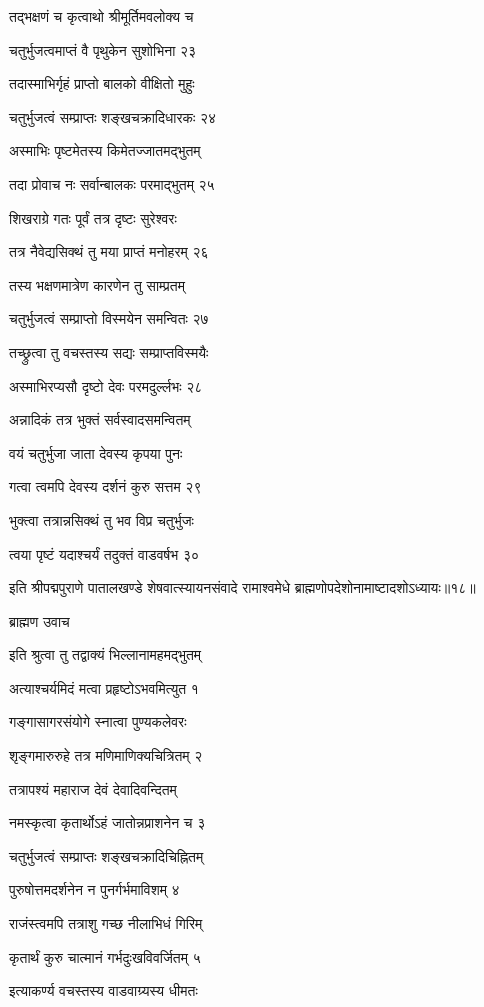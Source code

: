 तद्भक्षणं च कृत्वाथो श्रीमूर्तिमवलोक्य च

चतुर्भुजत्वमाप्तं वै पृथुकेन सुशोभिना २३

तदास्माभिर्गृहं प्राप्तो बालको वीक्षितो मुहुः

चतुर्भुजत्वं सम्प्राप्तः शङ्खचक्रादिधारकः २४

अस्माभिः पृष्टमेतस्य किमेतज्जातमद्भुतम्

तदा प्रोवाच नः सर्वान्बालकः परमाद्भुतम् २५

शिखराग्रे गतः पूर्वं तत्र दृष्टः सुरेश्वरः

तत्र नैवेद्यसिक्थं तु मया प्राप्तं मनोहरम् २६

तस्य भक्षणमात्रेण कारणेन तु साम्प्रतम्

चतुर्भुजत्वं सम्प्राप्तो विस्मयेन समन्वितः २७

तच्छ्रुत्वा तु वचस्तस्य सद्यः सम्प्राप्तविस्मयैः

अस्माभिरप्यसौ दृष्टो देवः परमदुर्ल्लभः २८

अन्नादिकं तत्र भुक्तं सर्वस्वादसमन्वितम्

वयं चतुर्भुजा जाता देवस्य कृपया पुनः

गत्वा त्वमपि देवस्य दर्शनं कुरु सत्तम २९

भुक्त्वा तत्रान्नसिक्थं तु भव विप्र चतुर्भुजः

त्वया पृष्टं यदाश्चर्यं तदुक्तं वाडवर्षभ ३०

इति श्रीपद्मपुराणे पातालखण्डे शेषवात्स्यायनसंवादे रामाश्वमेधे ब्राह्मणोपदेशोनामाष्टादशोऽध्यायः॥१८॥


ब्राह्मण उवाच

इति श्रुत्वा तु तद्वाक्यं भिल्लानामहमद्भुतम्

अत्याश्चर्यमिदं मत्वा प्रहृष्टोऽभवमित्युत १

गङ्गासागरसंयोगे स्नात्वा पुण्यकलेवरः

शृङ्गमारुरुहे तत्र मणिमाणिक्यचित्रितम् २

तत्रापश्यं महाराज देवं देवादिवन्दितम्

नमस्कृत्वा कृतार्थोऽहं जातोन्नप्राशनेन च ३

चतुर्भुजत्वं सम्प्राप्तः शङ्खचक्रादिचिह्नितम्

पुरुषोत्तमदर्शनेन न पुनर्गर्भमाविशम् ४

राजंस्त्वमपि तत्राशु गच्छ नीलाभिधं गिरिम्

कृतार्थं कुरु चात्मानं गर्भदुःखविवर्जितम् ५

इत्याकर्ण्य वचस्तस्य वाडवाग्र्यस्य धीमतः

